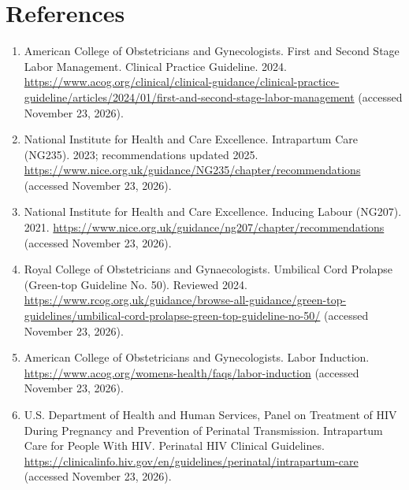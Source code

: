 \section*{References}
\begin{enumerate}
  \item American College of Obstetricians and Gynecologists. First and Second Stage Labor Management. Clinical Practice Guideline. 2024. \url{https://www.acog.org/clinical/clinical-guidance/clinical-practice-guideline/articles/2024/01/first-and-second-stage-labor-management} (accessed November 23, 2026).
  \item National Institute for Health and Care Excellence. Intrapartum Care (NG235). 2023; recommendations updated 2025. \url{https://www.nice.org.uk/guidance/NG235/chapter/recommendations} (accessed November 23, 2026).
  \item National Institute for Health and Care Excellence. Inducing Labour (NG207). 2021. \url{https://www.nice.org.uk/guidance/ng207/chapter/recommendations} (accessed November 23, 2026).
  \item Royal College of Obstetricians and Gynaecologists. Umbilical Cord Prolapse (Green-top Guideline No. 50). Reviewed 2024. \url{https://www.rcog.org.uk/guidance/browse-all-guidance/green-top-guidelines/umbilical-cord-prolapse-green-top-guideline-no-50/} (accessed November 23, 2026).
  \item American College of Obstetricians and Gynecologists. Labor Induction. \url{https://www.acog.org/womens-health/faqs/labor-induction} (accessed November 23, 2026).
  \item U.S. Department of Health and Human Services, Panel on Treatment of HIV During Pregnancy and Prevention of Perinatal Transmission. Intrapartum Care for People With HIV. Perinatal HIV Clinical Guidelines. \url{https://clinicalinfo.hiv.gov/en/guidelines/perinatal/intrapartum-care} (accessed November 23, 2026).
\end{enumerate}

\clearpage
